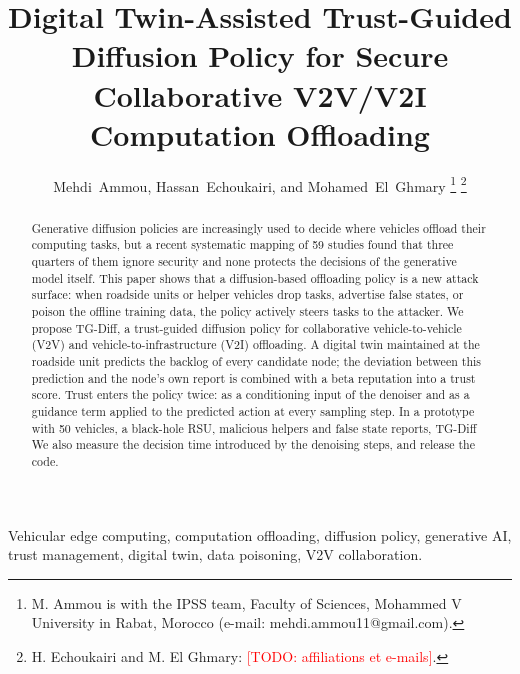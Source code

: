 \documentclass[journal]{IEEEtran}
\newcommand{\todo}[1]{\textcolor{red}{[TODO: #1]}}
\newcommand{\tgd}{TG-Diff}
\begin{document}
\title{Digital Twin-Assisted Trust-Guided Diffusion Policy for Secure Collaborative V2V/V2I Computation Offloading}

\author{Mehdi~Ammou, Hassan~Echoukairi, and Mohamed~El~Ghmary
\thanks{M. Ammou is with the IPSS team, Faculty of Sciences, Mohammed V University in Rabat, Morocco (e-mail: mehdi.ammou11@gmail.com).}
\thanks{H. Echoukairi and M. El Ghmary: \todo{affiliations et e-mails}.}}


\maketitle

\begin{abstract}
Generative diffusion policies are increasingly used to decide where vehicles offload their computing tasks, but a recent systematic mapping of 59 studies found that three quarters of them ignore security and none protects the decisions of the generative model itself. This paper shows that a diffusion-based offloading policy is a new attack surface: when roadside units or helper vehicles drop tasks, advertise false states, or poison the offline training data, the policy actively steers tasks to the attacker. We propose \tgd{}, a trust-guided diffusion policy for collaborative vehicle-to-vehicle (V2V) and vehicle-to-infrastructure (V2I) offloading. A digital twin maintained at the roadside unit predicts the backlog of every candidate node; the deviation between this prediction and the node's own report is combined with a beta reputation into a trust score. Trust enters the policy twice: as a conditioning input of the denoiser and as a guidance term applied to the predicted action at every sampling step. In a prototype with 50 vehicles, a black-hole RSU, malicious helpers and false state reports, \tgd{} \resAbstract{} We also measure the decision time introduced by the denoising steps, and release the code.
\end{abstract}

\begin{IEEEkeywords}
Vehicular edge computing, computation offloading, diffusion policy, generative AI, trust management, digital twin, data poisoning, V2V collaboration.
\end{IEEEkeywords}

\end{document}
